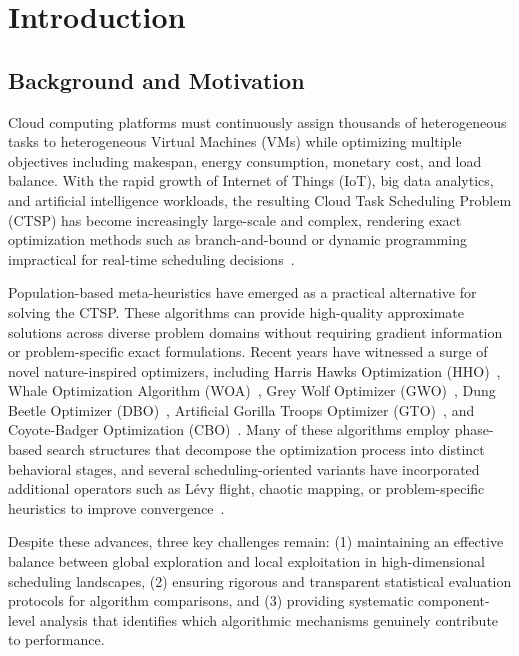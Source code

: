 \documentclass[pdflatex,onecolumn,sn-mathphys-num]{sn-jnl}
\begin{document}

\maketitle

\section{Introduction}\label{sec1}

\subsection{Background and Motivation}
Cloud computing platforms must continuously assign thousands of heterogeneous tasks to heterogeneous Virtual Machines (VMs) while optimizing multiple objectives including makespan, energy consumption, monetary cost, and load balance. With the rapid growth of Internet of Things (IoT), big data analytics, and artificial intelligence workloads, the resulting Cloud Task Scheduling Problem (CTSP) has become increasingly large-scale and complex, rendering exact optimization methods such as branch-and-bound or dynamic programming impractical for real-time scheduling decisions~\cite{Braun2001,Etminani2007}.

Population-based meta-heuristics have emerged as a practical alternative for solving the CTSP. These algorithms can provide high-quality approximate solutions across diverse problem domains without requiring gradient information or problem-specific exact formulations. Recent years have witnessed a surge of novel nature-inspired optimizers, including Harris Hawks Optimization (HHO)~\cite{Heidari2019}, Whale Optimization Algorithm (WOA)~\cite{Mirjalili2016}, Grey Wolf Optimizer (GWO)~\cite{Mirjalili2014}, Dung Beetle Optimizer (DBO)~\cite{Xue2022}, Artificial Gorilla Troops Optimizer (GTO)~\cite{Abdollahzadeh2021}, and Coyote-Badger Optimization (CBO)~\cite{Khatab2025}. Many of these algorithms employ phase-based search structures that decompose the optimization process into distinct behavioral stages, and several scheduling-oriented variants have incorporated additional operators such as L\'{e}vy flight, chaotic mapping, or problem-specific heuristics to improve convergence~\cite{Chintale2024,Sabipour2025,Zhu2025,Xie2024}.

Despite these advances, three key challenges remain: (1) maintaining an effective balance between global exploration and local exploitation in high-dimensional scheduling landscapes, (2) ensuring rigorous and transparent statistical evaluation protocols for algorithm comparisons, and (3) providing systematic component-level analysis that identifies which algorithmic mechanisms genuinely contribute to performance.
\end{document}
